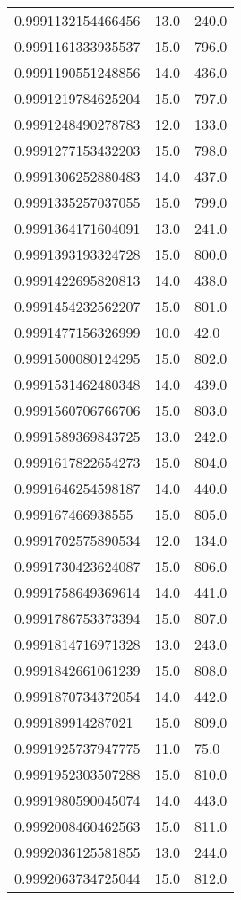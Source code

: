 \begin{center}
\begin{supertabular}[H]{p{0.30\textwidth}p{0.05\textwidth}p{0.05\textwidth}}
0.9991132154466456 & 13.0 & 240.0 \\ 
0.9991161333935537 & 15.0 & 796.0 \\ 
0.9991190551248856 & 14.0 & 436.0 \\ 
0.9991219784625204 & 15.0 & 797.0 \\ 
0.9991248490278783 & 12.0 & 133.0 \\ 
0.9991277153432203 & 15.0 & 798.0 \\ 
0.9991306252880483 & 14.0 & 437.0 \\ 
0.9991335257037055 & 15.0 & 799.0 \\ 
0.9991364171604091 & 13.0 & 241.0 \\ 
0.9991393193324728 & 15.0 & 800.0 \\ 
0.9991422695820813 & 14.0 & 438.0 \\ 
0.9991454232562207 & 15.0 & 801.0 \\ 
0.9991477156326999 & 10.0 & 42.0 \\ 
0.9991500080124295 & 15.0 & 802.0 \\ 
0.9991531462480348 & 14.0 & 439.0 \\ 
0.9991560706766706 & 15.0 & 803.0 \\ 
0.9991589369843725 & 13.0 & 242.0 \\ 
0.9991617822654273 & 15.0 & 804.0 \\ 
0.9991646254598187 & 14.0 & 440.0 \\ 
0.999167466938555 & 15.0 & 805.0 \\ 
0.9991702575890534 & 12.0 & 134.0 \\ 
0.9991730423624087 & 15.0 & 806.0 \\ 
0.9991758649369614 & 14.0 & 441.0 \\ 
0.9991786753373394 & 15.0 & 807.0 \\ 
0.9991814716971328 & 13.0 & 243.0 \\ 
0.9991842661061239 & 15.0 & 808.0 \\ 
0.9991870734372054 & 14.0 & 442.0 \\ 
0.999189914287021 & 15.0 & 809.0 \\ 
0.9991925737947775 & 11.0 & 75.0 \\ 
0.9991952303507288 & 15.0 & 810.0 \\ 
0.9991980590045074 & 14.0 & 443.0 \\ 
0.9992008460462563 & 15.0 & 811.0 \\ 
0.9992036125581855 & 13.0 & 244.0 \\ 
0.9992063734725044 & 15.0 & 812.0 \\ 

\end{supertabular}
\end{center}
